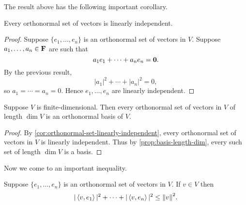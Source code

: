 The result above has the following important corollary.

\begin{corollary}\label{cor:orthonormal-set-linearly-independent}
Every orthonormal set of vectors is linearly independent.
\end{corollary}

\begin{proof}
Suppose $\{e_1,\dots,e_n\}$ is an orthonormal set of vectors in $V$. Suppose $a_1,\dots,a_n\in\mathbf F$ are such that
\[a_1e_1+\cdots+a_ne_n=\vb{0}.\]
By the previous result,
\[|a_1|^2+\cdots+|a_n|^2=0,\]
so $a_1=\cdots=a_n=0$. Hence $e_1,\dots,e_n$ are linearly independent.
\end{proof}

\begin{corollary}\label{cor:orthonormal-set-right-length-orthonormal-basis}
Suppose $V$ is finite-dimensional. Then every orthonormal set of vectors in $V$ of length $\dim V$ is an orthonormal basis of $V$.
\end{corollary}

\begin{proof}
By \ref{cor:orthonormal-set-linearly-independent}, every orthonormal set of vectors in $V$ is linearly independent. Thus by \ref{prop:basis-length-dim}, every such set of length $\dim V$ is a basis.
\end{proof}

Now we come to an important inequality.

\begin{lemma}
Suppose $\{e_1,\dots,e_n\}$ is an orthonormal set of vectors in $V$. If $v\in V$ then
\begin{equation}
|\left\langle v,e_1\right\rangle|^2+\cdots+|\left\langle v,e_n\right\rangle|^2\le\norm{v}^2.
\end{equation}
\end{lemma}

